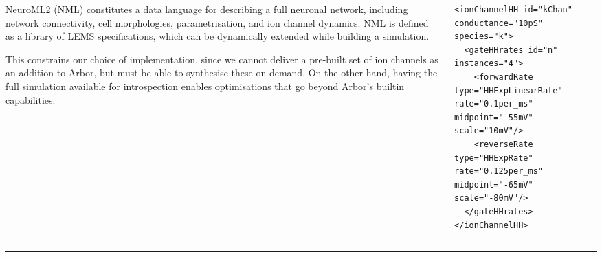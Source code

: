 \documentclass{beamer}
\begin{document}
\begin{frame}[t, fragile]
\begin{columns}
\begin{column}{0.49\textwidth}
      NeuroML2 (NML) constitutes a data language for describing a full neuronal
      network, including network connectivity, cell morphologies,
      parametrisation, and ion channel dynamics. NML is defined as a library of
      LEMS specifications, which can be dynamically extended while building a
      simulation.

      This constrains our choice of implementation, since we cannot deliver a
      pre-built set of ion channels as an addition to Arbor, but must be able to
      synthesise these on demand. On the other hand, having the full simulation
      available for introspection enables optimisations that go beyond Arbor's
      builtin capabilities.
    \end{column}
    \begin{column}{0.49\textwidth}
\begin{verbatim}
<ionChannelHH id="kChan" conductance="10pS" species="k">
  <gateHHrates id="n" instances="4">
    <forwardRate type="HHExpLinearRate" rate="0.1per_ms" midpoint="-55mV" scale="10mV"/>
    <reverseRate type="HHExpRate" rate="0.125per_ms" midpoint="-65mV" scale="-80mV"/>
  </gateHHrates>
</ionChannelHH>
\end{verbatim}
    \end{column}
  \end{columns}
  \vspace*{1ex}
  \textcolor{arbred}{\rule{\textwidth}{0.5ex}}
  \vspace*{-1ex}
  \begin{columns}
    \begin{column}{0.49\textwidth}
\end{column}
\end{columns}
\end{frame}
\end{document}
